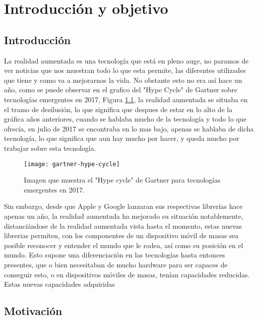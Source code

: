 \chapter{Introducción y objetivo}
\label{ch:introduccion}

\section{Introducción}
La realidad aumentada es una tecnología que está en pleno auge, no paramos de ver noticias que nos muestran todo lo que esta permite, las diferentes utilizades que tiene y como va a mejorarnos la vida. No obstante esto no era así hace un año, como se puede observar en el grafico del "Hype Cycle" de Gartner sobre tecnologías emergentes en 2017, Figura \ref{figura-gartner}, la realidad aumentada se situaba en el tramo de desilusión, lo que significa que despues de estar en lo alto de la gráfica años anteriores, cuando se hablaba mucho de la tecnología y todo lo que ofrecía, en julio de 2017 se encontraba en lo mas bajo, apenas se hablaba de dicha tecnología, lo que significa que aun hay mucho por hacer, y queda mucho por trabajar sobre esta tecnología.\\

\begin{figure}[h]
  \centering
  \texttt{[image: gartner-hype-cycle]}
  \caption{Imagen que muestra el "Hype cycle" de Gartner para tecnologías emergentes en 2017.\protect\footnotemark}
  \label{figura-gartner}
\end{figure}


Sin embargo, desde que Apple y Google lanzaran sus respectivas librerías hace apenas un año, la realidad aumentada ha mejorado su situación notablemente, distanciándose de la realidad aumentada vista hasta el momento, estas nuevas librerias permiten, con los componentes de un dispositivo móvil de masas sea posible reconocer y entender el mundo que le rodea, así como su posición en el mundo. Esto supone una diferenciación en las tecnologías hasta entonces presentes, que o bien necesitaban de mucho hardware para ser capaces de conseguir esto, o en dispositivos móviles de masas, tenían capacidades reducidas.\\

Estas nuevas capacidades adquiridas

\newpage

\section{Motivación}

